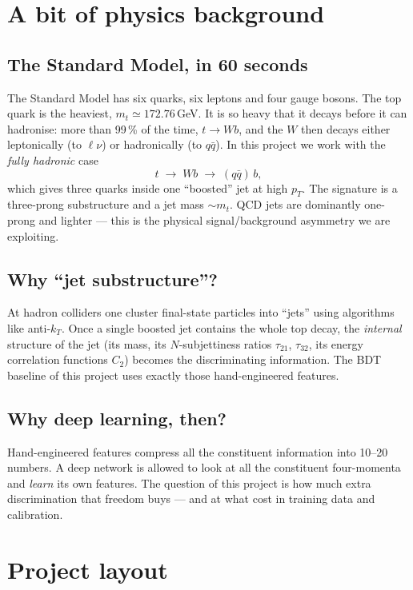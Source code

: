 \documentclass[11pt,a4paper]{article}
\begin{document}
\section{A bit of physics background}\label{sec:physics}

\subsection*{The Standard Model, in 60 seconds}
The Standard Model has six quarks, six leptons and four gauge bosons.
The top quark is the heaviest, $m_t\!\simeq\!172.76$\,GeV. It is so
heavy that it decays before it can hadronise: more than 99\,\% of the
time, $t\to W b$, and the $W$ then decays either leptonically
(to $\ell\nu$) or hadronically (to $q\bar q$). In this project we
work with the \emph{fully hadronic} case
\[
   t \;\to\; W b \;\to\; (q\bar q)\,b ,
\]
which gives three quarks inside one ``boosted'' jet at high
$p_T$. The signature is a three-prong substructure and a jet mass
$\sim\!m_t$. QCD jets are dominantly one-prong and lighter --- this
is the physical signal/background asymmetry we are exploiting.

\subsection*{Why ``jet substructure''?}
At hadron colliders one cluster final-state particles into ``jets''
using algorithms like anti-$k_T$. Once a single boosted jet contains
the whole top decay, the \emph{internal} structure of the jet
(its mass, its $N$-subjettiness ratios $\tau_{21}$, $\tau_{32}$, its
energy correlation functions $C_2$) becomes the discriminating
information. The BDT baseline of this project uses exactly those
hand-engineered features.

\subsection*{Why deep learning, then?}
Hand-engineered features compress all the constituent information
into 10--20 numbers. A deep network is allowed to look at all the
constituent four-momenta and \emph{learn} its own features. The
question of this project is how much extra discrimination that
freedom buys --- and at what cost in training data and calibration.

\section{Project layout}\label{sec:layout}
\end{document}
